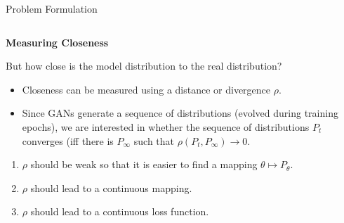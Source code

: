 \documentclass[aspectratio=169,xcolor=dvipsnames,svgnames,x11names,fleqn]{beamer}
\begin{document}
\begin{frame}[fragile]{Problem Formulation}
\begin{columns}[T]
        \begin{column}{0.55\textwidth}
            \textbf{Measuring Closeness}
            \vspace{0.2cm}
            
            {\small But how close is the model distribution to the real distribution?}
            
            \begin{itemize}
                \item Closeness can be measured using a distance or divergence $\rho$.
                \item Since GANs generate a sequence of distributions (evolved during training epochs), we are interested in whether the sequence of distributions $P_t$ converges (iff there is $P_{\infty}$ such that $\rho(P_t, P_{\infty}) \to 0$.
            \end{itemize}

            \begin{tcolorbox}[
                enhanced, 
                colback=white, 
                colframe=WGANOrange, 
                title=\small Desired Properties of $\rho$,
                fonttitle=\bfseries\small,
                boxrule=0.8pt
            ]
            \begin{enumerate}
                \scriptsize
                \item $\rho$ should be weak so that it is easier to find a mapping $\theta \mapsto P_\theta$.
                \item $\rho$ should lead to a continuous mapping.
                \item $\rho$ should lead to a continuous loss function.
            \end{enumerate}
            \end{tcolorbox}
        \end{column}
    \end{columns}
\end{frame}
\end{document}
